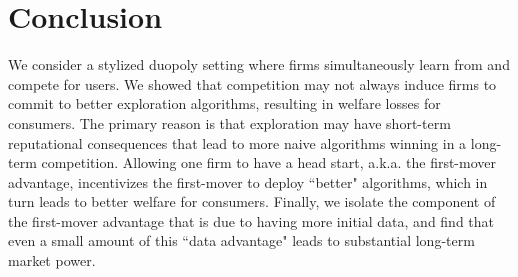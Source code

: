 \documentclass[../competing_bandits.tex]{subfiles}
\begin{document}
\section{Conclusion}\label{sec:conclusion}

We consider a stylized duopoly setting where firms simultaneously learn from and compete for users. We showed that competition may not always induce firms to commit to better exploration algorithms, resulting in welfare losses for consumers. The primary reason is that exploration may have short-term reputational consequences that lead to more naive algorithms winning in a long-term competition. Allowing one firm to have a head start, a.k.a. the first-mover advantage, incentivizes the first-mover to deploy ``better" algorithms, which in turn leads to better welfare for consumers. Finally, we isolate the component of the first-mover advantage that is due to having more initial data, and find that even a small amount of this ``data advantage" leads to substantial long-term market power.
\end{document}
